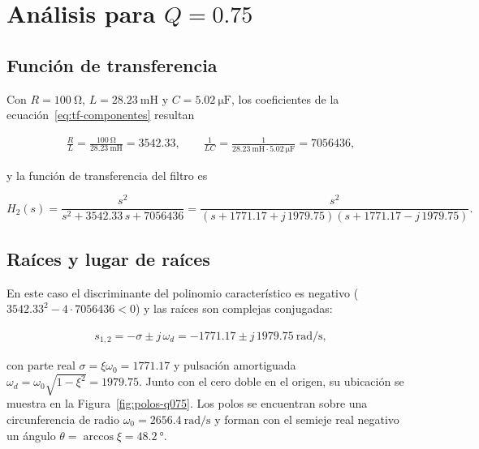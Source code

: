 \chapter{Análisis para $Q = \num{0.75}$}
\label{chap:q075}

\section{Función de transferencia}

Con $R = \qty{100}{\ohm}$, $L = \qty{28.23}{\milli\henry}$ y $C = \qty{5.02}{\micro\farad}$, los
coeficientes de la ecuación~\eqref{eq:tf-componentes} resultan

\begin{gather*}
  \frac{R}{L} = \frac{\qty{100}{\ohm}}{\qty{28.23}{\milli\henry}} = \num{3542.33}, \qquad
  \frac{1}{LC} = \frac{1}{\qty{28.23}{\milli\henry} \cdot \qty{5.02}{\micro\farad}} = \num{7056436},
\end{gather*}

y la función de transferencia del filtro es

\begin{equation}
  H_2(s) = \frac{s^2}{s^2 + \num{3542.33}\, s + \num{7056436}}
         = \frac{s^2}{\left(s + \num{1771.17} + j\,\num{1979.75}\right)
                       \left(s + \num{1771.17} - j\,\num{1979.75}\right)}.
  \label{eq:tf-q075}
\end{equation}

\section{Raíces y lugar de raíces}

En este caso el discriminante del polinomio característico es negativo
($\num{3542.33}^2 - 4 \cdot \num{7056436} < 0$) y las raíces son complejas conjugadas:

\begin{gather*}
  s_{1,2} = -\sigma \pm j\,\omega_d = \num{-1771.17} \pm j\,\num{1979.75}\ \unit{\radian\per\second},
\end{gather*}

con parte real $\sigma = \xi\omega_0 = \num{1771.17}$ y pulsación amortiguada
$\omega_d = \omega_0\sqrt{1 - \xi^2} = \num{1979.75}$. Junto con el cero doble en el origen, su ubicación
se muestra en la Figura~\ref{fig:polos-q075}. Los polos se encuentran sobre una circunferencia de radio
$\omega_0 = \qty{2656.4}{\radian\per\second}$ y forman con el semieje real negativo un ángulo
$\theta = \arccos\xi = \qty{48.2}{\degree}$.

